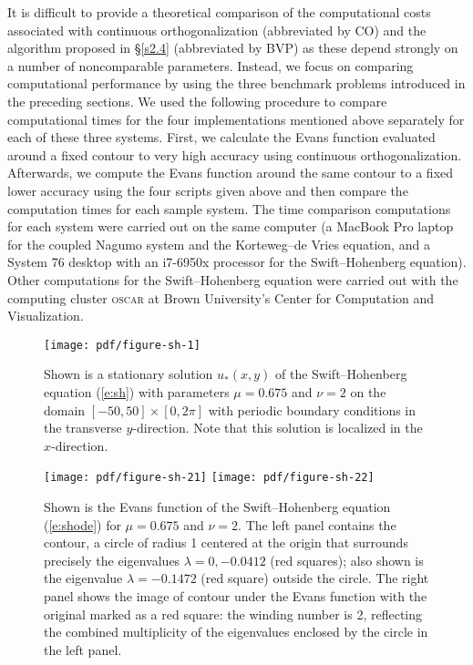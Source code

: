\documentclass[10pt]{article}
\numberwithin{equation}{section}
\begin{document}
It is difficult to provide a theoretical comparison of the computational costs associated with continuous orthogonalization (abbreviated by CO) and the algorithm proposed in \S\ref{s2.4} (abbreviated by BVP) as these depend strongly on a number of noncomparable parameters. Instead, we focus on comparing computational performance by using the three benchmark problems introduced in the preceding sections. We used the following procedure to compare computational times for the four implementations mentioned above separately for each of these three systems. First, we calculate the Evans function evaluated around a fixed contour to very high accuracy using continuous orthogonalization. Afterwards, we compute the Evans function around the same contour to a fixed lower accuracy using the four scripts given above and then compare the computation times for each sample system. The time comparison computations for each  system were carried out on the same computer (a MacBook Pro laptop for the coupled Nagumo system and the Korteweg--de Vries equation, and a System 76 desktop with an i7-6950x processor for the Swift--Hohenberg equation). Other computations for the Swift--Hohenberg equation were carried out with the computing cluster \textsc{oscar} at Brown University's Center for Computation and Visualization.

\begin{figure}
\centering
\texttt{[image: pdf/figure-sh-1]}
\caption{Shown is a stationary solution $u_*(x,y)$ of the Swift--Hohenberg equation (\ref{e:sh}) with parameters $\mu=0.675$ and $\nu=2$ on the domain $[-50,50]\times[0,2\pi]$ with periodic boundary conditions in the transverse $y$-direction. Note that this solution is localized in the $x$-direction.}
\label{f:sh1}
\end{figure}

\begin{figure}
\centering
\texttt{[image: pdf/figure-sh-21]} \qquad
\texttt{[image: pdf/figure-sh-22]} 
\caption{Shown is the Evans function of the Swift--Hohenberg equation (\ref{e:shode}) for $\mu=0.675$ and $\nu=2$. The left panel contains the contour, a circle of radius 1 centered at the origin that surrounds precisely the eigenvalues $\lambda=0,-0.0412$ (red squares); also shown is the eigenvalue $\lambda=-0.1472$ (red square) outside the circle. The right panel shows the image of contour under the Evans function with the original marked as a red square: the winding number is 2, reflecting the combined multiplicity of the eigenvalues enclosed by the circle in the left panel.}
\label{f:sh2}
\end{figure}
\end{document}
